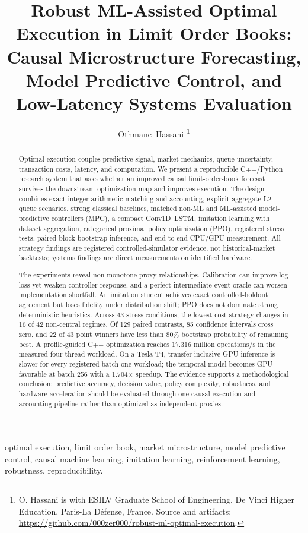 \documentclass[journal,10pt]{IEEEtran}
\title{Robust ML-Assisted Optimal Execution in Limit Order Books:\\
Causal Microstructure Forecasting, Model Predictive Control, and Low-Latency Systems Evaluation}
\author{Othmane~Hassani%
\thanks{O. Hassani is with ESILV Graduate School of Engineering, De Vinci Higher Education, Paris-La D\'efense, France. Source and artifacts: \url{https://github.com/000zer000/robust-ml-optimal-execution}.}}
\newcommand{\1}{\mathbf{1}}
\begin{document}
\maketitle

\begin{abstract}
Optimal execution couples predictive signal, market mechanics, queue uncertainty, transaction costs, latency, and computation. We present a reproducible C++/Python research system that asks whether an improved causal limit-order-book forecast survives the downstream optimization map and improves execution. The design combines exact integer-arithmetic matching and accounting, explicit aggregate-L2 queue scenarios, strong classical baselines, matched non-ML and ML-assisted model-predictive controllers (MPC), a compact Conv1D--LSTM, imitation learning with dataset aggregation, categorical proximal policy optimization (PPO), registered stress tests, paired block-bootstrap inference, and end-to-end CPU/GPU measurement. All strategy findings are registered controlled-simulator evidence, not historical-market backtests; systems findings are direct measurements on identified hardware.

The experiments reveal non-monotone proxy relationships. Calibration can improve log loss yet weaken controller response, and a perfect intermediate-event oracle can worsen implementation shortfall. An imitation student achieves exact controlled-holdout agreement but loses fidelity under distribution shift; PPO does not dominate strong deterministic heuristics. Across 43 stress conditions, the lowest-cost strategy changes in 16 of 42 non-central regimes. Of 129 paired contrasts, 85 confidence intervals cross zero, and 22 of 43 point winners have less than 80\% bootstrap probability of remaining best. A profile-guided C++ optimization reaches 17.316 million operations/s in the measured four-thread workload. On a Tesla T4, transfer-inclusive GPU inference is slower for every registered batch-one workload; the temporal model becomes GPU-favorable at batch 256 with a 1.704$\times$ speedup. The evidence supports a methodological conclusion: predictive accuracy, decision value, policy complexity, robustness, and hardware acceleration should be evaluated through one causal execution-and-accounting pipeline rather than optimized as independent proxies.
\end{abstract}

\begin{IEEEkeywords}
optimal execution, limit order book, market microstructure, model predictive control, causal machine learning, imitation learning, reinforcement learning, robustness, reproducibility.
\end{IEEEkeywords}
\end{document}
